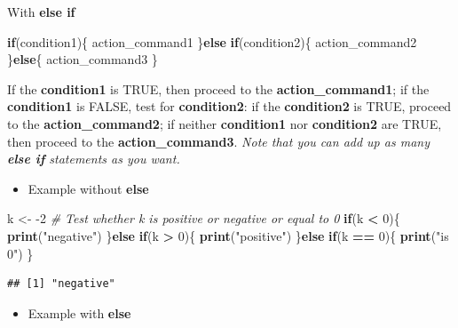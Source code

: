 \documentclass[]{book}
\newenvironment{Shaded}{\begin{snugshade}}{\end{snugshade}}
\newcommand{\CommentTok}[1]{\textcolor[rgb]{0.56,0.35,0.01}{\textit{#1}}}
\newcommand{\ControlFlowTok}[1]{\textcolor[rgb]{0.13,0.29,0.53}{\textbf{#1}}}
\newcommand{\DecValTok}[1]{\textcolor[rgb]{0.00,0.00,0.81}{#1}}
\newcommand{\KeywordTok}[1]{\textcolor[rgb]{0.13,0.29,0.53}{\textbf{#1}}}
\newcommand{\NormalTok}[1]{#1}
\newcommand{\OperatorTok}[1]{\textcolor[rgb]{0.81,0.36,0.00}{\textbf{#1}}}
\newcommand{\StringTok}[1]{\textcolor[rgb]{0.31,0.60,0.02}{#1}}
\providecommand{\tightlist}{%
  \setlength{\itemsep}{0pt}\setlength{\parskip}{0pt}}
\begin{document}
With \textbf{else if}

\begin{Shaded}
\begin{Highlighting}[]
\ControlFlowTok{if}\NormalTok{(condition1)\{}
\NormalTok{    action_command1}
\NormalTok{\}}\ControlFlowTok{else} \ControlFlowTok{if}\NormalTok{(condition2)\{}
\NormalTok{    action_command2}
\NormalTok{\}}\ControlFlowTok{else}\NormalTok{\{}
\NormalTok{    action_command3}
\NormalTok{\}}
\end{Highlighting}
\end{Shaded}

If the \textbf{condition1} is TRUE, then proceed to the \textbf{action\_command1}; if the \textbf{condition1} is FALSE, test for \textbf{condition2}: if the \textbf{condition2} is TRUE, proceed to the \textbf{action\_command2}; if neither \textbf{condition1} nor \textbf{condition2} are TRUE, then proceed to the \textbf{action\_command3}.
\emph{Note that you can add up as many \textbf{else if} statements as you want.}

\begin{itemize}
\tightlist
\item
  Example without \textbf{else}
\end{itemize}

\begin{Shaded}
\begin{Highlighting}[]
\NormalTok{k <-}\StringTok{ }\DecValTok{-2}
\CommentTok{# Test whether k is positive or negative or equal to 0}
\ControlFlowTok{if}\NormalTok{(k }\OperatorTok{<}\StringTok{ }\DecValTok{0}\NormalTok{)\{}
    \KeywordTok{print}\NormalTok{(}\StringTok{"negative"}\NormalTok{)}
\NormalTok{\}}\ControlFlowTok{else} \ControlFlowTok{if}\NormalTok{(k }\OperatorTok{>}\StringTok{ }\DecValTok{0}\NormalTok{)\{}
    \KeywordTok{print}\NormalTok{(}\StringTok{"positive"}\NormalTok{)}
\NormalTok{\}}\ControlFlowTok{else} \ControlFlowTok{if}\NormalTok{(k }\OperatorTok{==}\StringTok{ }\DecValTok{0}\NormalTok{)\{}
    \KeywordTok{print}\NormalTok{(}\StringTok{"is 0"}\NormalTok{)}
\NormalTok{\}}
\end{Highlighting}
\end{Shaded}

\begin{verbatim}
## [1] "negative"
\end{verbatim}

\begin{itemize}
\tightlist
\item
  Example with \textbf{else}
\end{itemize}
\end{document}
